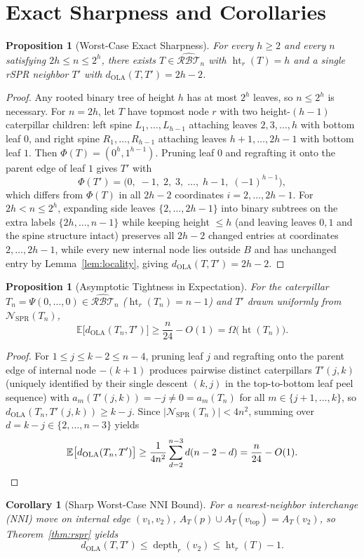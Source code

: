 \documentclass[11pt]{article}
\newtheorem{proposition}[theorem]{Proposition}
\newtheorem*{corollary}{Corollary}
\theoremstyle{definition}
\theoremstyle{remark}
\DeclareMathOperator{\htr}{ht}
\DeclareMathOperator{\depth}{depth}
\begin{document}
\section{Exact Sharpness and Corollaries}

\begin{proposition}[Worst-Case Exact Sharpness]\label{prop:sharp}
For every $h \ge 2$ and every $n$ satisfying $2h \le n \le 2^h$, there exists $T \in \widehat{\mathcal{RBT}}_n$ with $\htr_r(T) = h$ and a single rSPR neighbor $T'$ with $d_{\mathrm{OLA}}(T, T') = 2h - 2$.
\end{proposition}

\begin{proof}
Any rooted binary tree of height $h$ has at most $2^h$ leaves, so $n \le 2^h$ is necessary. For $n = 2h$, let $T$ have topmost node $r$ with two height-$(h-1)$ caterpillar children: left spine $L_1, \dots, L_{h-1}$ attaching leaves $2, 3, \dots, h$ with bottom leaf $0$, and right spine $R_1, \dots, R_{h-1}$ attaching leaves $h+1, \dots, 2h-1$ with bottom leaf $1$. Then $\Phi(T) = (0^h, 1^{h-1})$. Pruning leaf $0$ and regrafting it onto the parent edge of leaf $1$ gives $T'$ with
\[
  \Phi(T') = \bigl(0,\; -1,\; 2,\; 3,\; \dots,\; h-1,\; (-1)^{h-1}\bigr),
\]
which differs from $\Phi(T)$ in all $2h - 2$ coordinates $i = 2, \dots, 2h-1$. For $2h < n \le 2^h$, expanding side leaves $\{2, \dots, 2h-1\}$ into binary subtrees on the extra labels $\{2h, \dots, n-1\}$ while keeping height $\le h$ (and leaving leaves $0, 1$ and the spine structure intact) preserves all $2h - 2$ changed entries at coordinates $2, \dots, 2h-1$, while every new internal node lies outside $B$ and has unchanged entry by Lemma~\ref{lem:locality}, giving $d_{\mathrm{OLA}}(T, T') = 2h - 2$.
\end{proof}

\begin{proposition}[Asymptotic Tightness in Expectation]\label{prop:expectation}
For the caterpillar $T_n = \Psi(0, \dots, 0) \in \widehat{\mathcal{RBT}}_n$ ($\htr_r(T_n) = n - 1$) and $T'$ drawn uniformly from $\mathcal{N}_{\mathrm{SPR}}(T_n)$,
\[
  \mathbb{E}\bigl[d_{\mathrm{OLA}}(T_n, T')\bigr] \ge \frac{n}{24} - O(1) = \Omega\bigl(\htr(T_n)\bigr).
\]
\end{proposition}

\begin{proof}
For $1 \le j \le k - 2 \le n - 4$, pruning leaf $j$ and regrafting onto the parent edge of internal node $-(k+1)$ produces pairwise distinct caterpillars $T'(j, k)$ (uniquely identified by their single descent $(k, j)$ in the top-to-bottom leaf peel sequence) with $a_m(T'(j, k)) = -j \neq 0 = a_m(T_n)$ for all $m \in \{j+1, \dots, k\}$, so $d_{\mathrm{OLA}}(T_n, T'(j, k)) \ge k - j$. Since $|\mathcal{N}_{\mathrm{SPR}}(T_n)| < 4n^2$, summing over $d = k - j \in \{2, \dots, n-3\}$ yields
\[
  \mathbb{E}\bigl[d_{\mathrm{OLA}}(T_n, T')\bigr] \ge \frac{1}{4n^2} \sum_{d=2}^{n-3} d(n - 2 - d) = \frac{n}{24} - O(1). \qedhere
\]
\end{proof}

\begin{corollary}[Sharp Worst-Case NNI Bound]
For a nearest-neighbor interchange (NNI) move on internal edge $(v_1, v_2)$, $A_T(p) \cup A_T(v_{\mathrm{top}}) = A_T(v_2)$, so Theorem~\ref{thm:rspr} yields
\[
  d_{\mathrm{OLA}}(T, T') \le \depth_r(v_2) \le \htr_r(T) - 1.
\]
\end{corollary}
\end{document}
